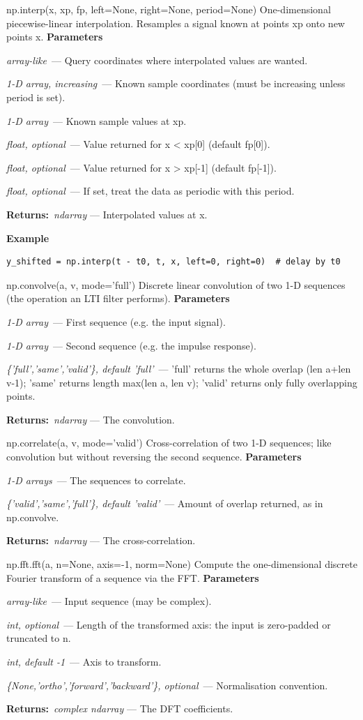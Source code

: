 \documentclass[10pt]{article}
\newenvironment{params}
  {\smallskip\textbf{\small\color{accent}Parameters}\par\nopagebreak
   \begin{description}[leftmargin=1.3em,itemsep=1.5pt,parsep=0pt,topsep=1pt,
      labelindent=0pt,style=sameline,font=\normalfont]}
  {\end{description}}
\newcommand{\pitem}[3]{\item[{\ttfamily\color{accent}#1}]{\itshape #2}\ --- #3}
\newcommand{\preturn}[2]{\smallskip\textbf{\small\color{accent}Returns:}\ {\itshape #1} --- #2\par}
\begin{document}
\begin{func}{np.interp(x, xp, fp, left=None, right=None, period=None)}
One-dimensional piecewise-linear interpolation. Resamples a signal known at points xp onto new points x.
\begin{params}
\pitem{x}{array-like}{Query coordinates where interpolated values are wanted.}
\pitem{xp}{1-D array, increasing}{Known sample coordinates (must be increasing unless period is set).}
\pitem{fp}{1-D array}{Known sample values at xp.}
\pitem{left}{float, optional}{Value returned for x < xp[0] (default fp[0]).}
\pitem{right}{float, optional}{Value returned for x > xp[-1] (default fp[-1]).}
\pitem{period}{float, optional}{If set, treat the data as periodic with this period.}
\end{params}
\preturn{ndarray}{Interpolated values at x.}
\smallskip\textbf{\small\color{accent}Example}
\begin{lstlisting}[style=py]
y_shifted = np.interp(t - t0, t, x, left=0, right=0)  # delay by t0
\end{lstlisting}
\end{func}
\medskip

\begin{func}{np.convolve(a, v, mode='full')}
Discrete linear convolution of two 1-D sequences (the operation an LTI filter performs).
\begin{params}
\pitem{a}{1-D array}{First sequence (e.g. the input signal).}
\pitem{v}{1-D array}{Second sequence (e.g. the impulse response).}
\pitem{mode}{\{'full','same','valid'\}, default 'full'}{'full' returns the whole overlap (len a+len v-1); 'same' returns length max(len a, len v); 'valid' returns only fully overlapping points.}
\end{params}
\preturn{ndarray}{The convolution.}
\end{func}
\medskip

\begin{func}{np.correlate(a, v, mode='valid')}
Cross-correlation of two 1-D sequences; like convolution but without reversing the second sequence.
\begin{params}
\pitem{a, v}{1-D arrays}{The sequences to correlate.}
\pitem{mode}{\{'valid','same','full'\}, default 'valid'}{Amount of overlap returned, as in np.convolve.}
\end{params}
\preturn{ndarray}{The cross-correlation.}
\end{func}
\medskip

\begin{func}{np.fft.fft(a, n=None, axis=-1, norm=None)}
Compute the one-dimensional discrete Fourier transform of a sequence via the FFT.
\begin{params}
\pitem{a}{array-like}{Input sequence (may be complex).}
\pitem{n}{int, optional}{Length of the transformed axis: the input is zero-padded or truncated to n.}
\pitem{axis}{int, default -1}{Axis to transform.}
\pitem{norm}{\{None,'ortho','forward','backward'\}, optional}{Normalisation convention.}
\end{params}
\preturn{complex ndarray}{The DFT coefficients.}
\end{func}
\medskip
\end{document}
